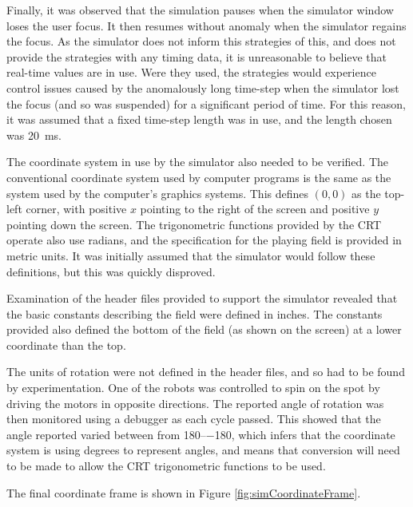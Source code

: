 \documentclass[10pt]{article}
\begin{document}
Finally, it was observed that the simulation pauses when the simulator window
loses the user focus.  It then resumes without anomaly when the simulator
regains the focus.  As the simulator does not inform this strategies of this,
and does not provide the strategies with any timing data, it is unreasonable to
believe that real-time values are in use.  Were they used, the strategies would
experience control issues caused by the anomalously long time-step when the
simulator lost the focus (and so was suspended) for a significant period of
time.  For this reason, it was assumed that a fixed time-step length was in use,
and the length chosen was \SI{20}{\milli\second}.

The coordinate system in use by the simulator also needed to be verified.  The
conventional coordinate system used by computer programs is the same as the
system used by the computer's graphics systems. This defines $\left(0,0\right)$
as the top-left corner, with positive $x$ pointing to the right of the screen
and positive $y$ pointing down the screen. The trigonometric functions provided
by the CRT operate also use radians, and the specification for the playing field
is provided in metric units.  It was initially assumed that the simulator would
follow these definitions, but this was quickly disproved.

Examination of the header files provided to support the simulator revealed that
the basic constants describing the field were defined in inches. The constants
provided also defined the bottom of the field (as shown on the screen) at a
lower coordinate than the top.

The units of rotation were not defined in the header files, and so had to be
found by experimentation.  One of the robots was controlled to spin on the spot
by driving the motors in opposite directions.  The reported angle of rotation
was then monitored using a debugger as each cycle passed.  This showed that the
angle reported varied between from \numrange{+180}{-180}, which infers that the
coordinate system is using degrees to represent angles, and means that
conversion will need to be made to allow the CRT trigonometric functions to be
used.

The final coordinate frame is shown in Figure \ref{fig:simCoordinateFrame}.
\end{document}

